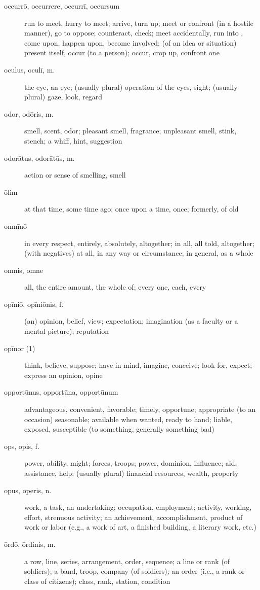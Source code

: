 \begin{description}
    \item[occurrō, occurrere, occurrī, occursum] \marginnote{*}run to meet, hurry to meet; arrive, turn up; meet or confront (in a hostile manner), go to oppose; counteract, check; meet accidentally, run into , come upon, happen upon, become involved; (of an idea or situation) present itself, occur (to a person); occur, crop up, confront one
    \item[oculus, oculī, m.] \marginnote{*}the eye, an eye; (usually plural) operation of the eyes, sight; (usually plural) gaze, look, regard
    \item[odor, odōris, m.] smell, scent, odor; pleasant smell, fragrance; unpleasant smell, stink, stench; a whiff, hint, suggestion
    \item[odorātus, odorātūs, m.] action or sense of smelling, smell
    \item[ōlim] \marginnote{*}at that time, some time ago; once upon a time, once; formerly, of old
    \item[omnīnō] in every respect, entirely, absolutely, altogether; in all, all told, altogether; (with negatives) at all, in any way or circumstance; in general, as a whole
    \item[omnis, omne] \marginnote{*}all, the entire amount, the whole of; every one, each, every
    \item[opīniō, opīniōnis, f.] (an) opinion, belief, view; expectation; imagination (as a faculty or a mental picture); reputation
    \item[opīnor (1)] think, believe, suppose; have in mind, imagine, conceive; look for, expect; express an opinion, opine
    \item[opportūnus, opportūna, opportūnum] advantageous, convenient, favorable; timely, opportune; appropriate (to an occasion) seasonable; available when wanted, ready to hand; liable, exposed, susceptible (to something, generally something bad)
    \item[ops, opis, f.] \marginnote{*}power, ability, might; forces, troops; power, dominion, influence; aid, assistance, help; (usually plural) financial resources, wealth, property
    \item[opus, operis, n.] \marginnote{*}work, a task, an undertaking; occupation, employment; activity, working, effort, strenuous activity; an achievement, accomplishment, product of work or labor (e.g., a work of art, a finished building, a literary work, etc.)
    \item[ōrdō, ōrdinis, m.] a row, line, series, arrangement, order, sequence; a line or rank (of soldiers); a band, troop, company (of soldiers); an order (i.e., a rank or class of citizens); class, rank, station, condition

\end{description}
